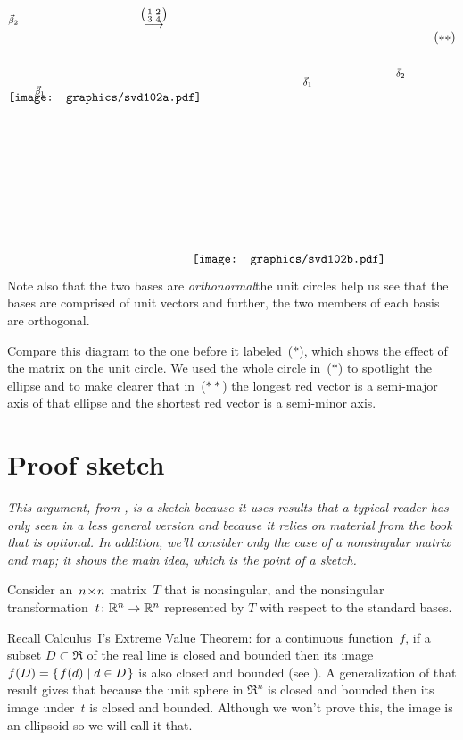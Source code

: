 \begin{equation*}
  \setlength{\unitlength}{1in}
  \begin{picture}(1.35,1.35)
    \put(0,1.825){\texttt{[image: graphics/svd102a.pdf]}}
    \put(.3,1.9){\scriptsize $\vec{\beta}_1$}
    \put(0,2.7){\scriptsize $\vec{\beta}_2$}
  \end{picture}
  \quad
  \raisebox{2.65in}{$\mapsunder{\big (\begin{smallmatrix} 1 &2 \\ 3 &4 \end{smallmatrix}\big )}$}
  \qquad
  \begin{picture}(2.45,3.15)
    \put(0,0){\texttt{[image: graphics/svd102b.pdf]}}
    \put(1.25,2){\scriptsize $\vec{\delta}_1$}
    \put(2.3,2.1){\scriptsize $\vec{\delta}_2$}
  \end{picture}
  \tag*{\raisebox{2.5in}{($**$)}}
\end{equation*}
Note also that the two bases are \textit{orthonormal}\Dash the unit circles help
us see that the bases are comprised of unit vectors and further,
the two members of each basis are orthogonal.

Compare this diagram to the one before it 
labeled~($*$), which shows the effect of the matrix
on the unit circle.
We used the whole circle in~($*$) to spotlight the ellipse and 
to make clearer that in~($**$)
the longest red vector is a
semi-major axis of that ellipse and the shortest red vector is a 
semi-minor axis.



\section{Proof sketch}

\textit{This argument, 
from \cite{BlankKrikorianSpring89},
is a sketch because it uses results that a typical reader has only 
seen in a less general version and because it relies on material from the
book that is optional.
In addition, we'll consider only the case of a nonsingular matrix and map;
it shows the main idea, which is the point of a sketch.}

Consider an~$n \! \times \! n$ matrix~$T$ that is nonsingular, and the
nonsingular transformation~$\mbox{$t\colon \mathbb{R}^n\to \mathbb{R}^n$}$ represented by
$T$ with respect to the standard bases.

Recall Calculus~I's Extreme Value Theorem: for a continuous
function~$f$, if a subset $D\subset \Re$ of the real line 
is closed and bounded then
its image $f(D)=\mbox{$\{\hspace{0.1em}f(d)\mid d\in D\hspace{0.1em}\}$}$ 
is also closed and bounded (see \cite{wiki:ExtremeValueThm}).
A generalization of that result gives that because the unit sphere in $\Re^n$
is closed and bounded then its image under~$t$ is closed and bounded.
Although we won't prove this, the image is an ellipsoid
so we will call it that. 

